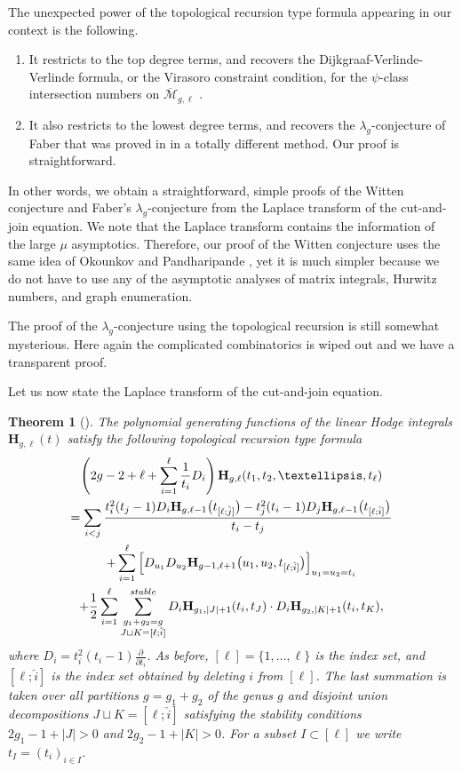 \documentclass{amsart}
\newtheorem{thm}{Theorem}[section]
\theoremstyle{definition}
\numberwithin{equation}{section}
\numberwithin{figure}{section}
\newcommand{\Mbar}{{\overline{\mathcal{M}}}}
\newcommand{\half}{{\frac{1}{2}}}
\begin{document}
The unexpected power \cite{MZ} of the topological recursion type
formula appearing in our context is the following.
\begin{enumerate}
\item It restricts to the top degree terms, and recovers 
the Dijkgraaf-Verlinde-Verlinde formula, or the 
Virasoro constraint condition, for the
$\psi$-class intersection numbers on $\Mbar_{g,\ell}$
\cite{W1991}.
\item It also restricts to the lowest degree terms,
and recovers the $\lambda_g$-conjecture of Faber that
was proved in \cite{FP1,FP2} in a totally different method.
Our proof is straightforward.
\end{enumerate}
In other words, we obtain a straightforward, simple
proofs of the Witten conjecture and Faber's 
$\lambda_g$-conjecture from the Laplace transform of
the cut-and-join equation.
We note that the Laplace transform contains the
information of the large $\mu$ asymptotics. Therefore,
our  proof \cite{MZ} of the Witten conjecture uses the 
same idea of Okounkov and 
Pandharipande \cite{OP1}, yet it is much simpler 
because we do not have to use any
 of the asymptotic analyses
of matrix integrals, Hurwitz numbers, and graph 
enumeration.


The proof of the $\lambda_g$-conjecture  using the
topological 
recursion is still somewhat mysterious. Here again 
the complicated combinatorics is  
wiped out and we have a transparent proof.



Let us now state the Laplace transform of the 
cut-and-join equation.


\begin{thm}[\cite{MZ}]
\label{thm:main}
The polynomial generating functions of the
linear Hodge integrals $\mathbf{H}_{g,\ell}(t)$ satisfy the
following topological recursion type formula
\begin{multline}
\label{eq:main}
\left(
2g-2+\ell +\sum_{i=1} ^\ell
\frac{1}{t_i}
D_i
\right)
\mathbf{H}_{g,\ell}(t_1,t_2,\dots,t_\ell)
\\
=
\sum_{i< j}
 \frac{  t_i ^2(t_j-1)D_i
    \mathbf{H}_{g,\ell-1}\big(t_{[\ell;\hat{j}]}\big)
    -
      t_j ^2(t_i-1)D_j
    \mathbf{H}_{g,\ell-1}\big(t_{[\ell;\hat{i}]}\big)}{t_i-t_j}
\\
+
\sum_{i=1} ^\ell
\left[
D_{u_1}D_{u_2}
\mathbf{H}_{g-1,\ell+1}\big(u_1,u_2,t_{[\ell;\hat{i}]}\big)
\right]_{u_1=u_2=t_i}
\\
+
\half
\sum_{i=1} ^\ell
\sum_{\substack{g_1+g_2 = g\\
J\sqcup K= [\ell;\hat{i}]}} ^{\rm{stable}}
D_i
\mathbf{H}_{g_1,|J|+1}(t_i,t_J)\cdot 
D_i
\mathbf{H}_{g_2,|K|+1}(t_i,t_K) ,
\end{multline}
where $D_i = t_i ^2 (t_i-1)\frac{\partial }{\partial t_i}$.
As before, $[\ell]=\{1,\dots,\ell\}$ is the index set,
and $[\ell;\hat{i}]$ is the index set obtained by 
deleting $i$ from $[\ell]$. 
The last summation is taken over all partitions
$g=g_1+g_2$  of the genus $g$ and disjoint union  decompositions
$J\sqcup K= [\ell;\hat{i}]$
satisfying the stability conditions
$2g_1-1+|J|>0$ and $2g_2-1+|K|>0$. For 
a subset $I\subset [\ell]$ we write $t_I = (t_i)_{i\in I}$. 
\end{thm}
\end{document}
